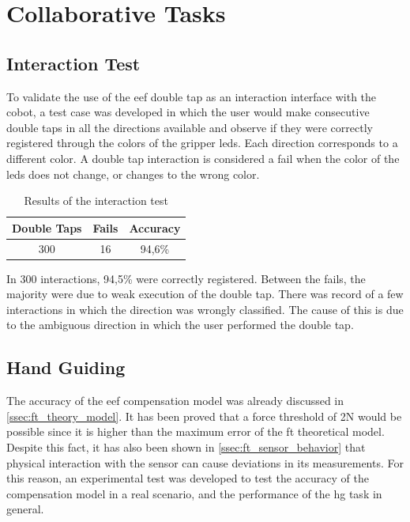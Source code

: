 \section{Collaborative Tasks}


\subsection{Interaction Test}

\par To validate the use of the \ac{eef} double tap as an interaction interface with the cobot, a test case was developed in which the user would make consecutive double taps in all the directions available and observe if they were correctly registered through the colors of the gripper \acsp{led}. Each direction corresponds to a different color. A double tap interaction is considered a fail when the color of the \acsp{led} does not change, or changes to the wrong color.

\begin{table}[h]
    \centering
    \begin{tabular}{|c|c|c|}
    \hline
    \textbf{Double Taps} & \textbf{Fails} & \textbf{Accuracy} \\ \hline
    300 & 16 & 94,6\% \\ \hline
    \end{tabular}
    \caption{Results of the interaction test}
    \label{tab:interaction_test}
\end{table}

\par In 300 interactions, 94,5\% were correctly registered. Between the fails, the majority were due to weak execution of the double tap. There was record of a few interactions in which the direction was wrongly classified. The cause of this is due to the ambiguous direction in which the user performed the double tap.



\subsection{Hand Guiding}

\par The accuracy of the \ac{eef} compensation model was already discussed in \autoref{ssec:ft_theory_model}. It has been proved that a force threshold of 2N would be possible since it is higher than the maximum error of the \ac{ft} theoretical model. Despite this fact, it has also been shown in \autoref{ssec:ft_sensor_behavior} that physical interaction with the sensor can cause deviations in its measurements. For this reason, an experimental test was developed to test the accuracy of the compensation model in a real scenario, and the performance of the \ac{hg} task in general.

